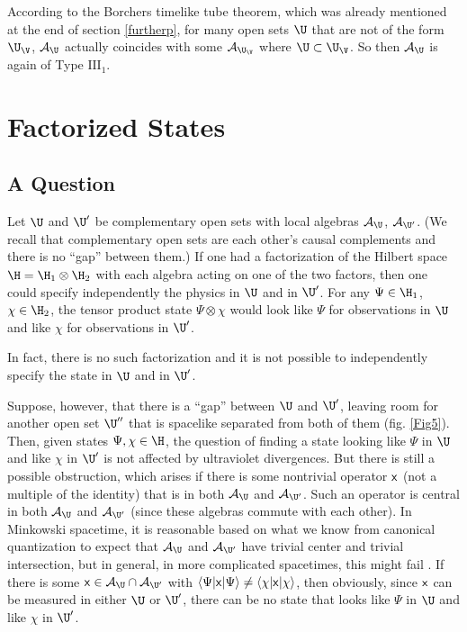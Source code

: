 \documentclass[12pt]{article}
\def\x{{\sf x}}
\def\III{{\mathrm{ III}}}
\def\ra{\rangle}
\def\la{\langle}
\numberwithin{equation}{section}
\def\A{{\mathcal A}}
\begin{document}
According to the Borchers timelike tube theorem, which was already mentioned at the end of section \ref{furtherp},
 for many open sets $\U$ that are not
of the  form $\U_\V$, $\A_\U$ actually coincides with some $\A_{\U_\V}$ where $\U\subset \U_\V$.  So then $\A_\U$ is 
again of Type $\III_1$.

\section{Factorized States}\label{indo}


\subsection{A Question}\label{aq}

\def\alg{{\mathrm{alg}}}

Let $\U$ and $\U'$ be complementary open sets with local algebras $\A_\U$, $\A_{\U'}$. (We recall that
complementary open sets are each other's causal complements and there is no ``gap'' between them.)
If one had a factorization of the Hilbert space $\H=\H_1\otimes \H_2$ 
with each algebra  acting on one of the two factors, then one could specify independently the physics in $\U$ and in $\U'$.
For any $\Psi\in\H_1$, $\chi\in\H_2$, the tensor product state $\Psi\otimes \chi$ would look like $\Psi$
for observations in $\U$ and like $\chi$ for observations in $\U'$.

In fact, there is no such  factorization and 
it is not possible to independently specify the
state in $\U$ and in $\U'$.


Suppose, however, that there is a ``gap''  between $\U$ and $\U'$, leaving room for another
open set $\U''$ that is spacelike separated from both of them (fig. \ref{Fig5}).   Then, given states $\Psi,\chi\in\H$,
 the question of finding a state
looking like $\Psi$ in $\U$ and like $\chi$ in $\U'$
 is not affected by ultraviolet divergences.  But there is still a possible obstruction, which
arises if there is some nontrivial operator $\x$ (not a multiple of the identity) that is in both $\A_\U$ and $\A_{\U'}$.
Such an operator is central in both $\A_\U$ and $\A_{\U'}$ (since these algebras commute with each other).
In Minkowski spacetime, it is reasonable based on what we know from canonical quantization
to expect that $\A_\U$ and $\A_{\U'}$ have trivial center and trivial
intersection, but in general,
in more complicated spacetimes, this might fail \cite{SchroerP,HO}.  If there is some $\x\in \A_\U\cap \A_{\U'}$ with
$\la\Psi|\x|\Psi\ra\not=\la\chi|\x|\chi\ra$, then obviously, since $\x$ can be measured in either $\U$ or $\U'$,
 there can be no state that looks like $\Psi$ in $\U$ and 
like $\chi$ in $\U'$.  
\end{document}
